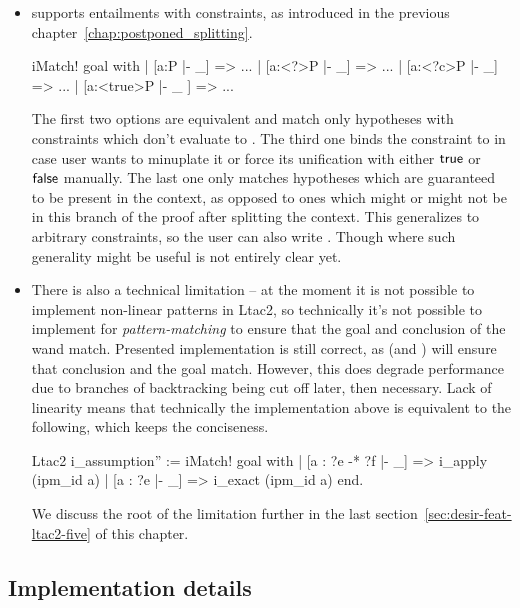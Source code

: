 \begin{itemize}
\item {} supports entailments with constraints, as introduced in the previous chapter~\ref{chap:postponed_splitting}.
\begin{coq}
iMatch! goal with
| [a:P |- _] => ...
| [a:<?>P |- _] => ...
| [a:<?c>P |- _] => ...
| [a:<true>P |- _ ] => ...
\end{coq}
The first two options are equivalent and match only hypotheses with constraints which don't evaluate to \false.
The third one binds the constraint to  in case user wants to minuplate it or force its unification with either $\textsf{true}$ or $\textsf{false}$ manually.
The last one only matches hypotheses which are guaranteed to be present in the context, as opposed to ones which might or might not be in this branch of the proof after splitting the context.
This generalizes to arbitrary constraints, so the user can also write .
Though where such generality might be useful is not entirely clear yet.
\item There is also a technical limitation -- at the moment it is not possible to implement non-linear patterns in Ltac2, so technically it's not possible to implement  for \emph{pattern-matching} to ensure that the goal and conclusion of the wand match.
  Presented implementation is still correct, as  (and ) will ensure that conclusion and the goal match.
  However, this does degrade performance due to branches of backtracking being cut off later, then necessary.
  Lack of linearity means that technically the implementation above is equivalent to the following, which keeps the conciseness.

\begin{minipage}{\linewidth}
\begin{coq}
Ltac2 i_assumption'' :=
  iMatch! goal with
  | [a : ?e -* ?f |- _] => i_apply (ipm_id a)
  | [a : ?e |- _] => i_exact (ipm_id a)
  end.
\end{coq}
\end{minipage}

We discuss the root of the limitation further in the last section~\ref{sec:desir-feat-ltac2-five} of this chapter.
\end{itemize}

\subsection{Implementation details}
\label{subsec:implementation_details}

